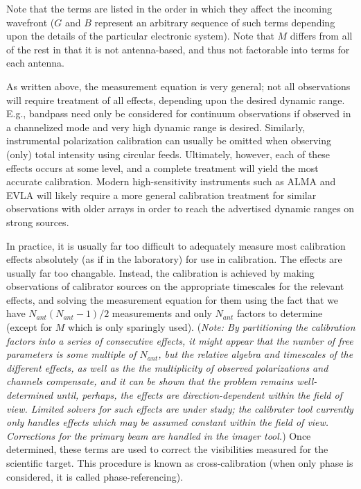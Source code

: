 Note that the terms are listed in the order in which they affect the
incoming wavefront ($G$ and $B$ represent an arbitrary sequence of
such terms depending upon the details of the particular electronic
system). Note that $M$ differs from all of the rest in that it is not
antenna-based, and thus not factorable into terms for each antenna. 

As written above, the measurement equation is very general; not all
observations will require treatment of all effects, depending upon the
desired dynamic range. E.g., bandpass need only be considered for
continuum observations if observed in a channelized mode and very high
dynamic range is desired. Similarly, instrumental polarization
calibration can usually be omitted when observing (only) total
intensity using circular feeds. Ultimately, however, each of these
effects occurs at some level, and a complete treatment will yield the
most accurate calibration. Modern high-sensitivity instruments such as
ALMA and EVLA will likely require a more general calibration treatment
for similar observations with older arrays in order to reach the
advertised dynamic ranges on strong sources. 

In practice, it is usually far too difficult to adequately measure
most calibration effects absolutely (as if in the laboratory) for use
in calibration. The effects are usually far too changable. Instead,
the calibration is achieved by making observations of calibrator
sources on the appropriate timescales for the relevant effects, and
solving the measurement equation for them using the fact that we have
$N_{ant}(N_{ant}-1)/2$ measurements and only $N_{ant}$ factors to
determine (except for $M$ which is only sparingly used). ({\it Note: By
partitioning the calibration factors into a series of consecutive
effects, it might appear that the number of free parameters is some
multiple of $N_{ant}$, but the relative algebra and timescales of the
different effects, as well as the the multiplicity of observed
polarizations and channels compensate, and it can be shown that the
problem remains well-determined until, perhaps, the effects are
direction-dependent within the field of view. Limited solvers for such
effects are under study; the calibrater tool currently only handles
effects which may be assumed constant within the field of
view. Corrections for the primary beam are handled in the imager
tool.}) Once determined, these terms are used to correct the
visibilities measured for the scientific target. This procedure is
known as cross-calibration (when only phase is considered, it is
called phase-referencing). 

